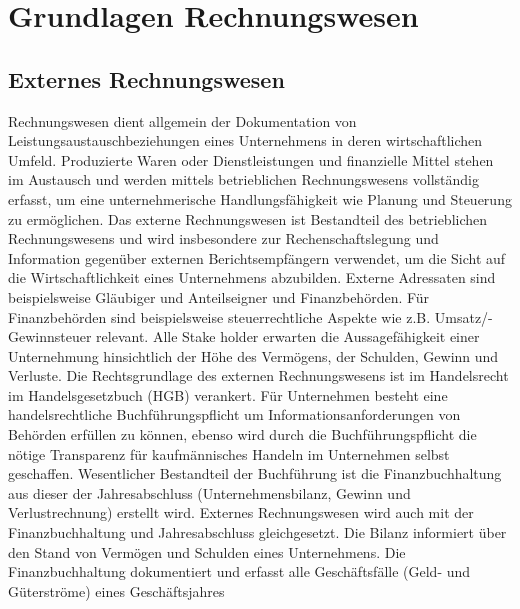 \section{Grundlagen Rechnungswesen}

\subsection{Externes Rechnungswesen}
\label{ssec:externesRechnungswesen}

Rechnungswesen dient allgemein der Dokumentation von Leistungsaustauschbeziehungen eines Unternehmens in deren wirtschaftlichen Umfeld. Produzierte Waren oder Dienstleistungen und finanzielle Mittel stehen im Austausch und werden mittels betrieblichen Rechnungswesens vollständig erfasst, um eine unternehmerische Handlungsfähigkeit wie Planung und Steuerung zu ermöglichen. Das externe Rechnungswesen ist Bestandteil des betrieblichen Rechnungswesens und wird insbesondere zur Rechenschaftslegung und Information gegenüber externen Berichtsempfängern verwendet, um die Sicht auf die Wirtschaftlichkeit eines Unternehmens abzubilden. Externe Adressaten sind beispielsweise Gläubiger und Anteilseigner und Finanzbehörden. Für Finanzbehörden sind beispielsweise steuerrechtliche Aspekte wie z.B. Umsatz/- Gewinnsteuer relevant. Alle Stake holder erwarten die Aussagefähigkeit einer Unternehmung hinsichtlich der Höhe des Vermögens, der Schulden, Gewinn und Verluste. Die Rechtsgrundlage des externen Rechnungswesens ist im Handelsrecht im Handelsgesetzbuch (HGB) verankert. Für Unternehmen besteht eine handelsrechtliche Buchführungspflicht um Informationsanforderungen von Behörden erfüllen zu können, ebenso wird durch die Buchführungspflicht die nötige Transparenz für kaufmännisches Handeln im Unternehmen selbst geschaffen.
Wesentlicher Bestandteil der Buchführung ist die Finanzbuchhaltung aus dieser der Jahresabschluss (Unternehmensbilanz,  Gewinn und Verlustrechnung) erstellt wird. Externes Rechnungswesen wird auch mit der Finanzbuchhaltung und Jahresabschluss gleichgesetzt. Die Bilanz informiert über den Stand von Vermögen und Schulden eines Unternehmens. Die Finanzbuchhaltung dokumentiert
und erfasst alle Geschäftsfälle (Geld- und Güterströme) eines Geschäftsjahres

